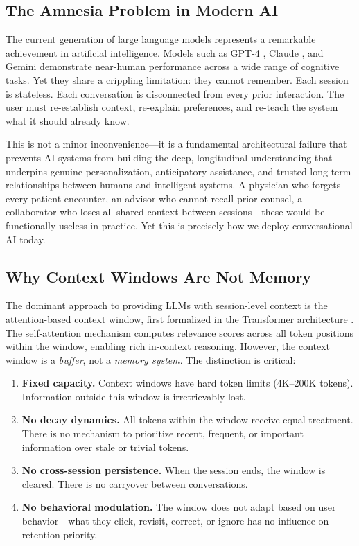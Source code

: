 \documentclass[11pt,a4paper]{article}
\begin{document}
\subsection{The Amnesia Problem in Modern AI}

The current generation of large language models represents a remarkable achievement in artificial intelligence. Models such as GPT-4 \citep{openai2023gpt4}, Claude \citep{anthropic2024claude}, and Gemini \citep{team2023gemini} demonstrate near-human performance across a wide range of cognitive tasks. Yet they share a crippling limitation: they cannot remember. Each session is stateless. Each conversation is disconnected from every prior interaction. The user must re-establish context, re-explain preferences, and re-teach the system what it should already know.

This is not a minor inconvenience---it is a fundamental architectural failure that prevents AI systems from building the deep, longitudinal understanding that underpins genuine personalization, anticipatory assistance, and trusted long-term relationships between humans and intelligent systems. A physician who forgets every patient encounter, an advisor who cannot recall prior counsel, a collaborator who loses all shared context between sessions---these would be functionally useless in practice. Yet this is precisely how we deploy conversational AI today.

\subsection{Why Context Windows Are Not Memory}

The dominant approach to providing LLMs with session-level context is the attention-based context window, first formalized in the Transformer architecture \citep{vaswani2017attention}. The self-attention mechanism computes relevance scores across all token positions within the window, enabling rich in-context reasoning. However, the context window is a \textit{buffer}, not a \textit{memory system}. The distinction is critical:

\begin{enumerate}[label=(\roman*)]
  \item \textbf{Fixed capacity.} Context windows have hard token limits (4K--200K tokens). Information outside this window is irretrievably lost.
  \item \textbf{No decay dynamics.} All tokens within the window receive equal treatment. There is no mechanism to prioritize recent, frequent, or important information over stale or trivial tokens.
  \item \textbf{No cross-session persistence.} When the session ends, the window is cleared. There is no carryover between conversations.
  \item \textbf{No behavioral modulation.} The window does not adapt based on user behavior---what they click, revisit, correct, or ignore has no influence on retention priority.
\end{enumerate}
\end{document}
